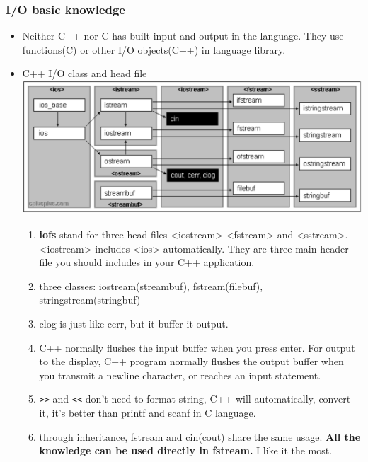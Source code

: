 \documentclass[a4paper,12pt,twoside]{book}
\begin{document}
\subsubsection{I/O basic knowledge}
\begin{itemize}
\item Neither C++ nor C has built input and output in the language. They use functions(C) or other I/O objects(C++) in language library.
\item C++ I/O class and head file \\
\includegraphics[scale=0.45]{pics/io.png}
\begin{enumerate}


\item \textbf{iofs} stand for three head files <iostream> <fstream> and <sstream>. <iostream> includes <ios> automatically. They are three main header file you should includes in your C++ application.

\item three classes: iostream(streambuf), fstream(filebuf), stringstream(stringbuf)

\item clog is just like cerr, but it buffer it output.

\item C++ normally flushes the input buffer when you press enter. For output to the display, C++ program normally flushes the output buffer when you transmit a newline character, or reaches an input statement.

\item \verb=>>= and \verb=<<= don't need to format string,  C++ will automatically,  convert it, it's better than printf and scanf in C language.

\item through inheritance, fstream and cin(cout) share the same usage. \textbf{All the knowledge can be used directly in fstream.} I like it the most.

\end{enumerate}

\end{itemize}
\end{document}

